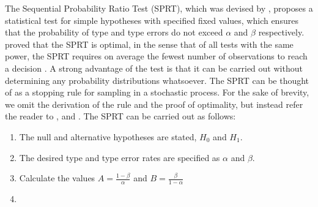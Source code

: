 The Sequential Probability Ratio Test (SPRT), which was devised by \citeauthor{Wald1945SequentialHypotheses}, proposes a statistical test for simple hypotheses with specified fixed values, which ensures that the probability of type  and type  errors do not exceed $\alpha$ and $\beta$ respectively. \citeauthor{Wald1948OptimumTest} proved that the SPRT is optimal, in the sense that of all tests with the same power, the SPRT requires on average the fewest number of observations to reach a decision \cite{Wald1948OptimumTest}. A strong advantage of the test is that it can be carried out without determining any probability distributions whatsoever. The SPRT can be thought of as a stopping rule for sampling in a stochastic process. For the sake of brevity, we omit the derivation of the rule and the proof of optimality, but instead refer the reader to \cite{Wald1945SequentialHypotheses}, \cite{Wald1950BayesProblems} and \cite{Wald1948OptimumTest}. The SPRT can be carried out as follows:


\begin{enumerate}
    \item The null and alternative hypotheses are stated, $H_0$ and $H_1$.
    \item The desired type  and type  error rates are specified as $\alpha$ and $\beta$.
    \item Calculate the values $A = \frac{1-\beta}{\alpha}$ and $B = \frac{\beta}{1-\alpha}$
    \item 
\end{enumerate}


